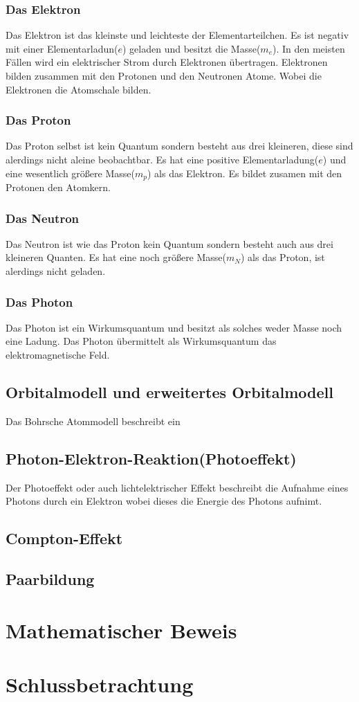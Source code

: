 \documentclass[11pt,a4paper,oneside]{report}
\begin{document}
\subsection{Das Elektron}
Das Elektron ist das kleinste und leichteste der Elementarteilchen. Es ist negativ mit einer Elementarladun($e$) geladen und besitzt die Masse($m_e$). In den meisten Fällen wird ein elektrischer Strom durch Elektronen übertragen. Elektronen bilden zusammen mit den Protonen und den Neutronen Atome. Wobei die Elektronen die Atomschale bilden.

\subsection{Das Proton}
Das Proton selbst ist kein Quantum sondern besteht aus drei kleineren, diese sind alerdings nicht aleine beobachtbar. Es hat eine positive Elementarladung($e$) und eine wesentlich größere Masse($m_p$) als das Elektron. Es bildet zusamen mit den Protonen den Atomkern.

\subsection{Das Neutron}
Das Neutron ist wie das Proton kein Quantum sondern besteht auch aus drei kleineren Quanten. Es hat eine noch größere Masse($m_N$) als das Proton, ist alerdings nicht geladen.

\subsection{Das Photon}
Das Photon ist ein Wirkumsquantum und besitzt als solches weder Masse noch eine Ladung. Das Photon übermittelt als Wirkumsquantum das elektromagnetische Feld.

\section{Orbitalmodell und erweitertes Orbitalmodell}
Das Bohrsche Atommodell beschreibt ein 

\section{Photon-Elektron-Reaktion(Photoeffekt)}
Der Photoeffekt oder auch lichtelektrischer Effekt beschreibt die Aufnahme eines Photons durch ein Elektron wobei dieses die Energie des Photons aufnimt.\cite{stroppe08}

\section{Compton-Effekt}

\section{Paarbildung}

\chapter{Mathematischer Beweis}

\chapter{Schlussbetrachtung}




\end{document}
